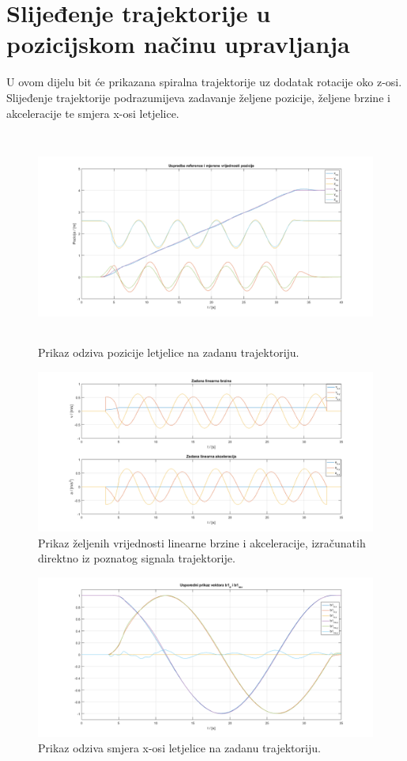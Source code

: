 \documentclass[times, utf8, diplomski]{fer}
\begin{document}
	\section{Slijeđenje trajektorije u pozicijskom načinu upravljanja}
	U ovom dijelu bit će prikazana spiralna trajektorije uz dodatak rotacije oko z-osi. Slijeđenje trajektorije podrazumijeva zadavanje željene pozicije, željene brzine i akceleracije te smjera x-osi letjelice.
	
	\begin{figure}[h!]
		\includegraphics[width=\textwidth, height=7cm]{plots/traj_pos2.png}
		\caption{Prikaz odziva pozicije letjelice na zadanu trajektoriju.}
	\end{figure}
	
	\newpage
	\clearpage
	
	\begin{figure}[h!]
		\includegraphics[width=\textwidth]{plots/traj_a_v2.png}
		\caption{Prikaz željenih vrijednosti linearne brzine i akceleracije, izračunatih direktno iz poznatog signala trajektorije.}
	\end{figure}
	
	\begin{figure}[h!]
		\includegraphics[width=\textwidth]{plots/traj_b1d2.png}
		\caption{Prikaz odziva smjera x-osi letjelice na zadanu trajektoriju. }
	\end{figure}
	
\end{document}
